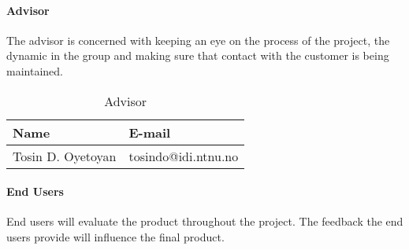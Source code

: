 \paragraph{Advisor}

The advisor is concerned with keeping an eye on the process of the project, the dynamic in the group and making sure that contact with the customer is being maintained. 

\begin{table}[H]

\begin{center}
    \begin{tabular}{| l | l |}
    \hline
    {\bf Name} & {\bf E-mail} \\ \hline
    Tosin D. Oyetoyan & tosindo@idi.ntnu.no \\
    \hline
    \end{tabular}
\end{center}

\caption{Advisor}
\end{table}

\paragraph{End Users}

End users will evaluate the product throughout the project. The feedback the end users provide will influence the final product.


